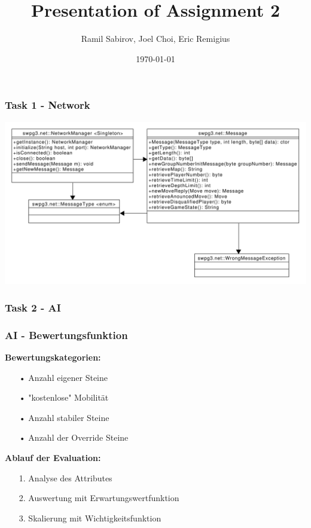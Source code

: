 \documentclass{beamer}
\title[Assignment2]{Presentation of Assignment 2} %
\author{Ramil Sabirov, Joel Choi, Eric Remigius} %
\institute[] %
{
RWTH Aachen \\ %
\medskip
\textit{Gruppe 3}
}
\date{\today} %
\begin{document}
\begin{frame}
\titlepage %
\end{frame}


\begin{frame}
\frametitle{Task 1 - Network}

\includegraphics[width=\textwidth]{NetPackageClassdiagramm}

\end{frame}


\begin{frame}
\frametitle{Task 2 - AI}

\end{frame}


\begin{frame}
\frametitle{AI - Bewertungsfunktion}

\textbf{Bewertungskategorien:}
\begin{enumerate}
\item[•] Anzahl eigener Steine
\item[•] "kostenlose" Mobilität
\item[•] Anzahl stabiler Steine
\item[•] Anzahl der Override Steine
\end{enumerate}

\pause
\hfill\break

\textbf{Ablauf der Evaluation:}
\begin{enumerate}
\item[1.] Analyse des Attributes
\item[2.] Auswertung mit Erwartungswertfunktion
\item[3.] Skalierung mit Wichtigkeitsfunktion
\end{enumerate}


\end{frame}
\end{document}
